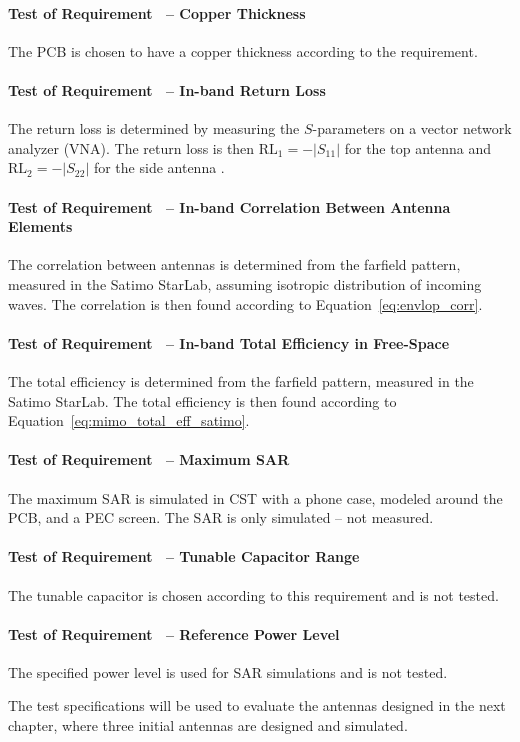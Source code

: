 \paragraph{Test of Requirement~ -- Copper Thickness}
The PCB is chosen to have a copper thickness according to the requirement.

\paragraph{Test of Requirement~ -- In-band Return Loss}
The return loss is determined by measuring the $S$-parameters on a vector network analyzer (VNA). The return loss is then $\text{RL}_1 = -|S_{11}|$ for the top antenna and $\text{RL}_2 = -|S_{22}|$ for the side antenna \cite{pozar2011microwave}.

\paragraph{Test of Requirement~ -- In-band Correlation Between Antenna Elements}
The correlation between antennas is determined from the farfield pattern, measured in the Satimo StarLab, assuming isotropic distribution of incoming waves. The correlation is then found according to Equation~\ref{eq:envlop_corr}.

\paragraph{Test of Requirement~ -- In-band Total Efficiency in Free-Space}
The total efficiency is determined from the farfield pattern, measured in the Satimo StarLab.
The total efficiency is then found according to Equation~\ref{eq:mimo_total_eff_satimo}.

\paragraph{Test of Requirement~ -- Maximum SAR}
The maximum SAR is simulated in CST with a phone case, modeled around the PCB, and a PEC screen. The SAR is only simulated -- not measured.

\paragraph{Test of Requirement~ -- Tunable Capacitor Range} 
The tunable capacitor is chosen according to this requirement and is not tested.

\paragraph{Test of Requirement~ -- Reference Power Level}
The specified power level is used for SAR simulations and is not tested.

\begin{aautail}
The test specifications will be used to evaluate the antennas designed in the next chapter, where three initial antennas are designed and simulated.
\end{aautail}


